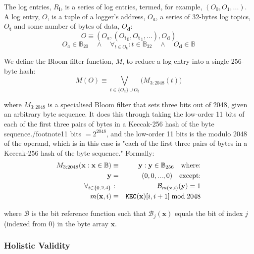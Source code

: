 \documentclass[9pt,oneside]{amsart}
\begin{document}
\begin{multicols}{2}

The log entries, $R_\mathbf{l}$, is a series of log entries, termed, for example, $(O_0, O_1, ...)$. A log entry, $O$, is a tuple of a logger's address, $O_a$, a series of 32-bytes log topics, $O_\mathbf{t}$ and some number of bytes of data, $O_\mathbf{d}$:
\begin{equation}
O \equiv (O_a, ({O_\mathbf{t}}_0, {O_\mathbf{t}}_1, ...), O_\mathbf{d})
\end{equation}
\begin{equation}
O_a \in \mathbb{B}_{20} \quad \wedge \quad \forall_{t \in O_\mathbf{t}}: t \in \mathbb{B}_{32} \quad \wedge \quad O_\mathbf{d} \in \mathbb{B}
\end{equation}

We define the Bloom filter function, $M$, to reduce a log entry into a single 256-byte hash:
\begin{equation}
M(O) \equiv \bigvee_{t \in \{O_a\} \cup O_\mathbf{t}} \big( M_{3:2048}(t) \big)
\end{equation}

where $M_{3:2048}$ is a specialised Bloom filter that sets three bits out of 2048, given an arbitrary byte sequence. It does this through taking the low-order 11 bits of each of the first three pairs of bytes in a Keccak-256 hash of the byte sequence./footnote{11 bits $= 2^2048$, and the low-order 11 bits is the modulo 2048 of the operand, which is in this case is "each of the first three pairs of bytes in a Keccak-256 hash of the byte sequence."} Formally:
\begin{eqnarray}
M_{3:2048}(\mathbf{x}: \mathbf{x} \in \mathbb{B}) & \equiv & \mathbf{y}: \mathbf{y} \in \mathbb{B}_{256} \quad \text{where:}\\
\mathbf{y} & = & (0, 0, ..., 0) \quad \text{except:}\\
\forall_{i \in \{0, 2, 4\}}&:& \mathcal{B}_{m(\mathbf{x}, i)}(\mathbf{y}) = 1\\
m(\mathbf{x}, i) &\equiv& \mathtt{\tiny KEC}(\mathbf{x})[i, i + 1] \bmod 2048
\end{eqnarray}

where $\mathcal{B}$ is the bit reference function such that $\mathcal{B}_j(\mathbf{x})$ equals the bit of index $j$ (indexed from 0) in the byte array $\mathbf{x}$.

\subsubsection{Holistic Validity}


\end{multicols}
\end{document}

